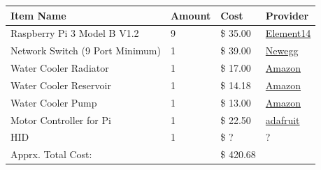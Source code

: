 \documentclass{article}
\begin{document}
\begin{center}
    \center
    \begin{tabular}{ | l | l | l | l |}
    \hline
    Item Name & Amount & Cost & Provider \\ \hline
	Raspberry Pi 3 Model B V1.2 & 9 & \$ 35.00 & \href{www.newark.com/raspberry-pi/rpi2-modb-v1-2/sbc-raspberry-pi-2-model-b-v1/dp/95Y1948?COM=superwidget-link_RaspberryPi}{Element14}\\ \hline
    Network Switch (9 Port Minimum) & 1 & \$ 39.00 & \href{https://www.newegg.com/Product/Product.aspx?item=N82E16833704087}{Newegg} \\ \hline
    Water Cooler Radiator & 1 & \$ 17.00 & \href{http://a.co/1dHksiW}{Amazon} \\ \hline
    Water Cooler Reservoir & 1 & \$ 14.18 & \href{http://a.co/0tiCxUf}{Amazon} \\ \hline
    Water Cooler Pump & 1  & \$ 13.00 & \href{http://a.co/dSwtybB}{Amazon} \\ \hline
    Motor Controller for Pi & 1 & \$ 22.50 & \href{https://www.adafruit.com/product/2348}{adafruit}\\ \hline
    HID & 1 & \$ ? & ? \\ \hline
    Apprx. Total Cost: & & \$ 420.68 & \\
    \hline
    \end{tabular}
\end{center}
\end{document}
